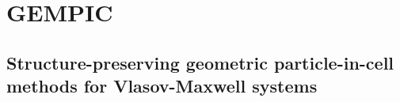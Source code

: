 \chapter{GEMPIC}

\section{Structure-preserving geometric particle-in-cell methods for Vlasov-Maxwell systems}
